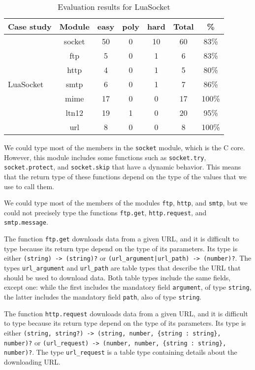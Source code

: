 \begin{table}[!ht]
\begin{center}
\begin{tabular}{|l|c|c|c|c|c|c|}
\hline
\textbf{Case study} & \textbf{Module} & \textbf{easy} & \textbf{poly} & \textbf{hard} & \textbf{Total} & \textbf{\%} \\
\hline
\multirow{7}{*}{LuaSocket}
& socket & 50 & 0 & 10 & 60 & 83\% \\
\cline{2-7}
& ftp & 5 & 0 & 1 & 6 & 83\% \\
\cline{2-7}
& http & 4 & 0 & 1 & 5 & 80\% \\
\cline{2-7}
& smtp & 6 & 0 & 1 & 7 & 86\% \\
\cline{2-7}
& mime & 17 & 0 & 0 & 17 & 100\% \\
\cline{2-7}
& ltn12 & 19 & 1 & 0 & 20 & 95\% \\
\cline{2-7}
& url & 8 & 0 & 0 & 8 & 100\% \\
\hline
\end{tabular}
\end{center}
\caption{Evaluation results for LuaSocket}
\label{tab:evalsocket}
\end{table}

We could type most of the members in the \texttt{socket} module,
which is the C core.
However, this module includes some functions such as
\texttt{socket.try}, \texttt{socket.protect}, and \texttt{socket.skip}
that have a dynamic behavior.
This means that the return type of these functions depend on the
type of the values that we use to call them.

We could type most of the members of the modules \texttt{ftp},
\texttt{http}, and \texttt{smtp}, but we could not precisely type
the functions \texttt{ftp.get}, \texttt{http.request}, and
\texttt{smtp.message}.

The function \texttt{ftp.get} downloads data from a given URL,
and it is difficult to type because its return type depend on
the type of its parameters.
Its type is either \texttt{(string) -> (string)?} or
\texttt{(url\string_argument|url\string_path) -> (number)?}.
The types \texttt{url\string_argument} and \texttt{url\string_path}
are table types that describe the URL that should be used to
download data.
Both table types include the same fields, except one:
while the first includes the mandatory field \texttt{argument},
of type \texttt{string}, the latter includes the mandatory field
\texttt{path}, also of type \texttt{string}.

The function \texttt{http.request} downloads data from a given URL,
and it is difficult to type because its return type depend on
the type of its parameters.
Its type is either
\texttt{(string, string?) -> (string, number, \{string : string\}, number)?} or
\texttt{(url\string_request) -> (number, number, \{string : string\}, number)?}.
The type \texttt{url\string_request} is a table type containing
details about the downloading URL.

